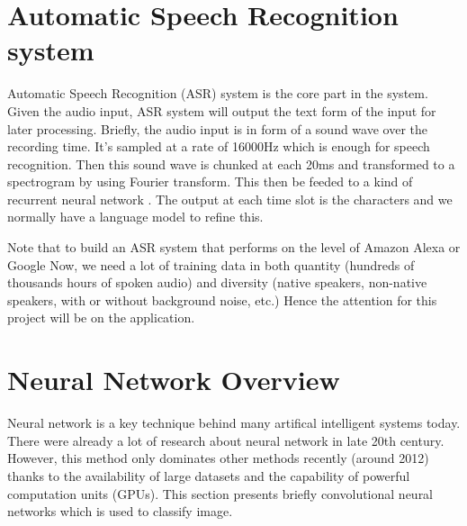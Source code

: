 \section{Automatic Speech Recognition system}
Automatic Speech Recognition (ASR) system is the core part in the system. Given the audio input, ASR system will output the text form of the input for later processing. Briefly, the audio input is in form of a sound wave over the recording time. It's sampled at a rate of 16000Hz which is enough for speech recognition. Then this sound wave is chunked at each 20ms and transformed to a spectrogram by using Fourier transform. This then be feeded to a kind of recurrent neural network \cite{Medium:2016}. The output at each time slot is the characters and we normally have a language model to refine this. 

Note that to build an ASR system that performs on the level of Amazon Alexa or Google Now, we need a lot of training data in both quantity (hundreds of thousands hours of spoken audio) and diversity (native speakers, non-native speakers, with or without background noise, etc.) Hence the attention for this project will be on the application.

\section{Neural Network Overview}
Neural network is a key technique behind many artifical intelligent systems today. There were already a lot of research about neural network in late 20th century. However, this method only dominates other methods recently (around 2012) thanks to the availability of large datasets and the capability of powerful computation units (GPUs). This section presents briefly convolutional neural networks which is used to classify image.
